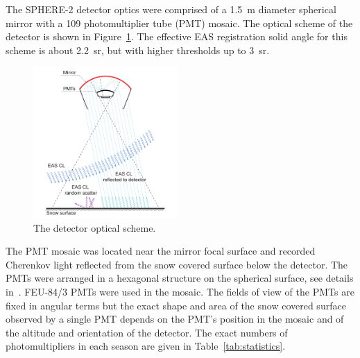 \documentclass[universe,article,accept,moreauthors,pdftex]{Definitions/mdpi}
\begin{document}
The \mbox{SPHERE-2} detector optics {were} comprised of a 1.5~m diameter spherical mirror with a 109 photomultiplier tube (PMT) mosaic. The optical scheme of the detector is shown in Figure~\ref{fig:optics}.
The effective EAS registration solid angle for this scheme is about 2.2~sr, but with higher thresholds up to 3~sr.

\begin{figure}[H]
    \includegraphics[width=0.49\textwidth]{optics}
    \caption{The detector optical scheme.}
\label{fig:optics}
\end{figure}





The PMT mosaic was located near the mirror focal surface and recorded Cherenkov light reflected from the snow covered surface below the detector. The PMTs were arranged in a hexagonal structure on the spherical surface, see details in~\cite{Ant20}. 
FEU-84/3 PMTs were used in the mosaic. The fields of view of the PMTs are fixed in angular terms but the exact shape and area of the snow covered surface observed by a single PMT depends on the PMT's position in the mosaic and of the altitude and orientation of the detector. The exact numbers of photomultipliers in each season are given in Table~\ref{tab:statistics}. 
\end{document}
